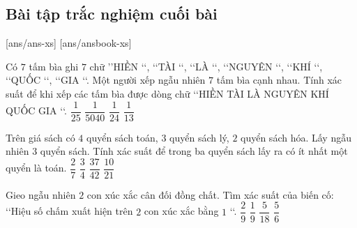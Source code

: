 \subsection{Bài tập trắc nghiệm cuối bài}
\setcounter{ex}{0}
[ans/ans-xs]
[ans/ansbook-xs]
\begin{ex}%
	Có $7$ tấm bìa ghi $7$ chữ \rq\rq HIỀN \lq\lq , \lq\lq  TÀI \lq\lq , \lq\lq  LÀ \lq\lq , \lq\lq  NGUYÊN \lq\lq , \lq\lq  KHÍ \lq\lq , \lq\lq  QUỐC \lq\lq , \lq\lq  GIA \lq\lq . Một người xếp ngẫu nhiên $7$ tấm bìa cạnh nhau. Tính xác suất để khi xếp các tấm bìa được dòng chữ \lq\lq  HIỀN TÀI LÀ NGUYÊN KHÍ QUỐC GIA \lq\lq . 
	\choice
	{$\dfrac{1}{25}$}
	{\True $\dfrac{1}{5040}$}
	{$\dfrac{1}{24}$}
	{$\dfrac{1}{13}$}
\end{ex}

\begin{ex}%
	Trên giá sách có $4$ quyển sách toán, $3$ quyển sách lý, $2$ quyển sách hóa. Lấy ngẫu nhiên $3$ quyển sách. Tính xác suất để trong ba quyển sách lấy ra có ít nhất một quyển là toán. 
	\choice
	{$\dfrac{2}{7}$}
	{$\dfrac{3}{4}$}
	{\True $\dfrac{37}{42}$}
	{$\dfrac{10}{21}$}
\end{ex}

\begin{ex}%
	Gieo ngẫu nhiên $2$ con xúc xắc cân đối đồng chất. Tìm xác suất của biến cố$\colon$ \lq\lq  Hiệu số chấm xuất hiện trên $2$ con xúc xắc bằng $1$ \lq\lq . 
	\choice
	{$\dfrac{2}{9}$}
	{$\dfrac{1}{9}$}
	{\True $\dfrac{5}{18}$}
	{$\dfrac{5}{6}$}
\end{ex}

